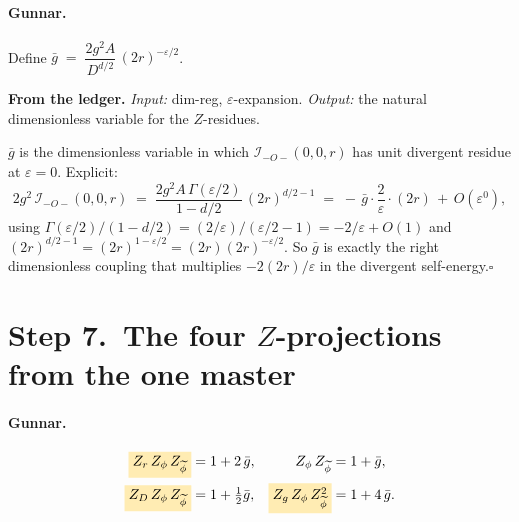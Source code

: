 \documentclass[11pt,a4paper]{article}
\newcommand{\hl}[1]{\colorbox{gunnaryellow}{$#1$}}
\begin{document}
\paragraph{Gunnar.} Define
$\bar g \;=\; \dfrac{2g^{2}A}{D^{d/2}}\,(2r)^{-\varepsilon/2}$.

\begin{cfacbox}
\textbf{From the ledger.} \emph{Input:} dim-reg, $\varepsilon$-expansion. \emph{Output:}
the natural dimensionless variable for the $Z$-residues.

\medskip
$\bar g$ is the dimensionless variable in which $\mathcal I_{-O-}(0,0,r)$ has unit
divergent residue at $\varepsilon=0$. Explicit:
\[
2g^{2}\,\mathcal I_{-O-}(0,0,r)
\;=\; \frac{2g^{2}A\,\Gamma(\varepsilon/2)}{1-d/2}\,(2r)^{d/2-1}
\;=\; -\,\bar g\cdot\frac{2}{\varepsilon}\cdot(2r) \,+\, O(\varepsilon^{0}),
\]
using $\Gamma(\varepsilon/2)/(1-d/2) = (2/\varepsilon)/(\varepsilon/2-1) = -2/\varepsilon + O(1)$
and $(2r)^{d/2-1} = (2r)^{1-\varepsilon/2} = (2r)(2r)^{-\varepsilon/2}$. So
$\bar g$ is exactly the right dimensionless coupling that multiplies $-2(2r)/\varepsilon$
in the divergent self-energy.\hfill$\square$
\end{cfacbox}

\section*{Step 7.\ The four $Z$-projections from the one master}

\paragraph{Gunnar.}
\begin{align*}
\hl{Z_{r}\,Z_{\phi}\,Z_{\widetilde\phi}} &= 1 + 2\,\bar g, &
Z_{\phi}\,Z_{\widetilde\phi} &= 1 + \bar g, \\
\hl{Z_{D}\,Z_{\phi}\,Z_{\widetilde\phi}} &= 1 + \tfrac{1}{2}\bar g, &
\hl{Z_{g}\,Z_{\phi}\,Z_{\widetilde\phi}^{2}} &= 1 + 4\,\bar g.
\end{align*}
\end{document}

